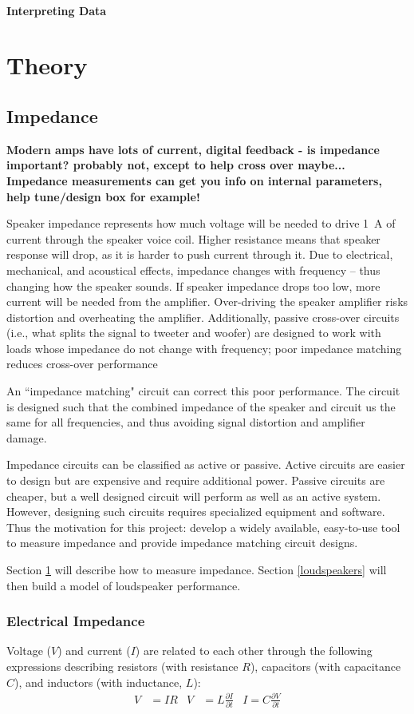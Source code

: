 \documentclass[10pt]{book}
\begin{document}
\subsection{Interpreting Data}
\part{Theory}
\chapter{Impedance}\label{Impedance}
\textbf{Modern amps have lots of current, digital feedback - is impedance important? probably not, except to help cross over maybe... Impedance measurements can get you info on internal parameters, help tune/design box for example!}

Speaker impedance represents how much voltage will be needed to drive 1~A of current  through the speaker voice coil. Higher resistance means that speaker response will drop, as it is harder to push current through it. Due to electrical, mechanical, and acoustical effects, impedance changes with frequency -- thus changing how the speaker sounds. If speaker impedance drops too low, more current will be needed from the amplifier. Over-driving the speaker amplifier risks distortion and overheating the amplifier. Additionally, passive cross-over circuits (i.e., what splits the signal to tweeter and woofer) are designed to work with loads whose impedance do not change with frequency; poor impedance matching reduces cross-over performance

An ``impedance matching" circuit can correct this poor performance. The circuit is designed such that the combined impedance of the speaker and circuit us the same for all frequencies, and thus avoiding signal distortion and amplifier damage.

Impedance circuits can be classified as active or passive. Active circuits are easier to design but are expensive and require additional power. Passive circuits are cheaper, but a well designed circuit will perform as well as an active system. However, designing such circuits requires specialized equipment and software. Thus the motivation for this project: develop a widely available, easy-to-use tool to measure impedance and provide impedance matching circuit designs.

Section \ref{Impedance} will describe how to measure impedance. Section \ref{loudspeakers} will then build a model of loudspeaker performance.
\section{Electrical Impedance}
Voltage ($V$) and current ($I$) are related to each other through the following expressions describing resistors (with resistance $R$), capacitors (with capacitance $C$), and inductors (with inductance, $L$):
\begin{align}\label{electrical_eqs}
V&=IR & V&=L\frac{\partial I}{\partial t} & I=C\frac{\partial V}{\partial t}
\end{align}
\end{document}
